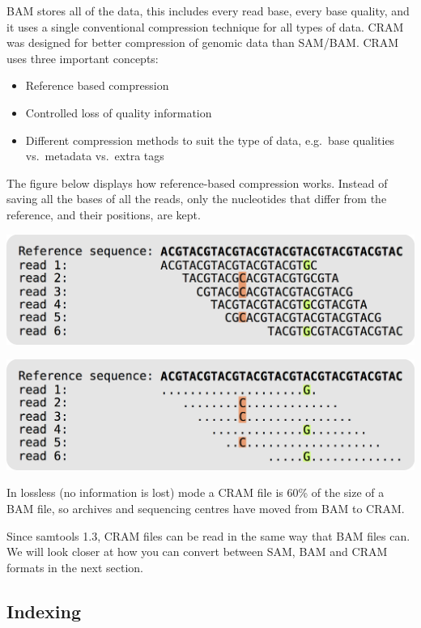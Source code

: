 \documentclass[11pt]{article}
\providecommand{\tightlist}{%
      \setlength{\itemsep}{0pt}\setlength{\parskip}{0pt}}
\begin{document}
    BAM stores all of the data, this includes every read base, every base
quality, and it uses a single conventional compression technique for all
types of data. CRAM was designed for better compression of genomic data
than SAM/BAM. CRAM uses three important concepts:

\begin{itemize}
\tightlist
\item
  Reference based compression
\item
  Controlled loss of quality information
\item
  Different compression methods to suit the type of data, e.g.~base
  qualities vs.~metadata vs.~extra tags
\end{itemize}

The figure below displays how reference-based compression works. Instead
of saving all the bases of all the reads, only the nucleotides that
differ from the reference, and their positions, are kept.

    \includegraphics{img/CRAM_format.png}

    \includegraphics{img/CRAM_format2.png}

    In lossless (no information is lost) mode a CRAM file is 60\% of the
size of a BAM file, so archives and sequencing centres have moved from
BAM to CRAM.

Since samtools 1.3, CRAM files can be read in the same way that BAM
files can. We will look closer at how you can convert between SAM, BAM
and CRAM formats in the next section.

    \hypertarget{indexing}{%
\subsection{Indexing}\label{indexing}}
\end{document}

